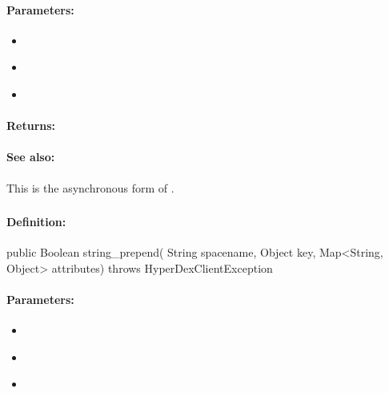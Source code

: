 \paragraph{Parameters:}
\begin{itemize}[noitemsep]
\item {}\\

\item {}\\

\item {}\\

\end{itemize}

\paragraph{Returns:}


\paragraph{See also:}  This is the asynchronous form of .

\pagebreak
\subsubsection{}
\label{api:java:string_prepend}


\paragraph{Definition:}
\begin{javacode}
public Boolean string_prepend(
        String spacename,
        Object key,
        Map<String, Object> attributes) throws HyperDexClientException
\end{javacode}

\paragraph{Parameters:}
\begin{itemize}[noitemsep]
\item {}\\

\item {}\\

\item {}\\

\end{itemize}

